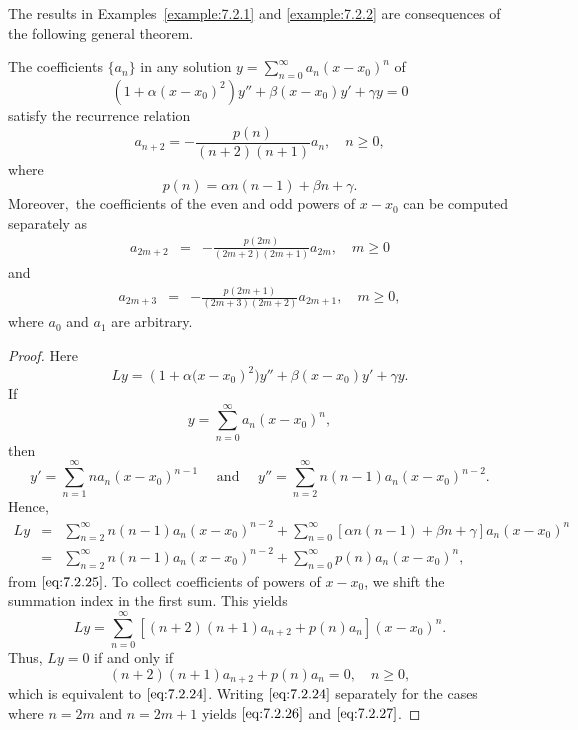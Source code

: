 \documentclass{ximera}
\begin{document}
The results in Examples~\ref{example:7.2.1} and \ref{example:7.2.2} are
consequences of the following general theorem.

\begin{theorem}\label{thmtype:7.2.2}
The coefficients $\{a_n\}$ in any solution
$y=\sum_{n=0}^\infty a_n(x-x_0)^n$ of
\begin{equation}\label{eq:7.2.23}
\left(1+\alpha(x-x_0)^2\right)y''+\beta(x-x_0) y'+\gamma y=0
\end{equation}
satisfy the recurrence relation
\begin{equation}\label{eq:7.2.24}
a_{n+2}=-\frac{p(n)}{(n+2)(n+1)}a_n,\quad  n\geq0,
\end{equation}
where
\begin{equation}\label{eq:7.2.25}
p(n)=\alpha n(n-1) +\beta n+\gamma.
\end{equation}
Moreover$,$ the coefficients of the even and odd powers of $x-x_0$ can
be computed separately as
\begin{eqnarray}
a_{2m+2}&=&-\frac{p(2m)}{(2m+2)(2m+1)}a_{2m},\quad m\geq0\label{eq:7.2.26}
\end{eqnarray}
and
\begin{eqnarray}
a_{2m+3}&=&-\frac{p(2m+1)}{(2m+3)(2m+2)}a_{2m+1},\quad m\geq0, \label{eq:7.2.27}
\end{eqnarray}
where $a_0$ and $a_1$ are arbitrary.
\end{theorem}

\begin{proof}
Here
$$
Ly=\left(1+\alpha(x-x_0\right)^2)y''+\beta(x-x_0) y'+\gamma y.
$$
If
$$
y=\sum_{n=0}^\infty a_n(x-x_0)^n,
$$
then
$$
y'=\sum_{n=1}^\infty na_n(x-x_0)^{n-1}
\quad\mbox{ and }\quad y''=\sum_{n=2}^\infty n(n-1)a_n(x-x_0)^{n-2}.
$$
Hence,
$$
\begin{array}{ccl}
Ly&=&\sum_{n=2}^\infty n(n-1)a_n(x-x_0)^{n-2}+
\sum_{n=0}^\infty \left[\alpha
n(n-1)
+\beta n+\gamma\right]a_n(x-x_0)^n\\
&=&\sum_{n=2}^\infty n(n-1)a_n(x-x_0)^{n-2}+\sum_{n=0}^\infty
p(n)a_n(x-x_0)^n,
\end{array}
$$
from $\eqref{eq:7.2.25}$.  To collect coefficients of powers of $x-x_0$,
we shift the summation index in the first sum. This yields
$$
Ly=\sum_{n=0}^\infty \left[(n+2)(n+1)a_{n+2}+p(n)a_n\right](x-x_0)^n.
$$
Thus, $Ly=0$ if and only if
$$
(n+2)(n+1)a_{n+2}+p(n)a_n=0,\quad n\geq0,
$$
which is equivalent to $\eqref{eq:7.2.24}$. Writing $\eqref{eq:7.2.24}$ separately
for the cases where $n=2m$ and $n=2m+1$ yields $\eqref{eq:7.2.26}$ and
$\eqref{eq:7.2.27}$.
\end{proof}
\end{document}
